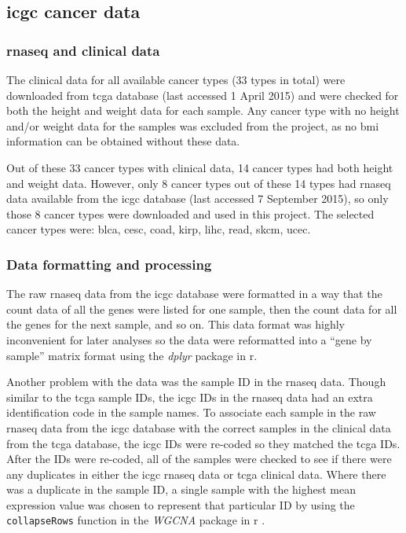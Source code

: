 \subsection{\gls{icgc} cancer data}
\label{sub:icgc_cancer_data}

\subsubsection{\gls{rnaseq} and clinical data}
\label{ssub:rnaseq_and_clinical_data}

The clinical data for all available cancer types (33 types in total) were downloaded from \gls{tcga} database (last accessed 1 April 2015) and were checked for both the height and weight data for each sample.
Any cancer type with no height and/or weight data for the samples was excluded from the project, as no \gls{bmi} information can be obtained without these data.

Out of these 33 cancer types with clinical data, 14 cancer types had both height and weight data.
However, only 8 cancer types out of these 14 types had \gls{rnaseq} data available from the \gls{icgc} database (last accessed 7 September 2015), so only those 8 cancer types were downloaded and used in this project.
The selected cancer types were: \gls{blca}, \gls{cesc}, \gls{coad}, \gls{kirp}, \gls{lihc}, \gls{read}, \gls{skcm}, \gls{ucec}.

\subsubsection{Data formatting and processing}
\label{ssub:data_formatting_and_processing}

The raw \gls{rnaseq} data from the \gls{icgc} database were formatted in a way that the count data of all the genes were listed for one sample, then the count data for all the genes for the next sample, and so on.
This data format was highly inconvenient for later analyses so the data were reformatted into a ``gene by sample'' matrix format using the \textit{dplyr} package in \gls{r}.

Another problem with the data was the sample ID in the \gls{rnaseq} data.
Though similar to the \gls{tcga} sample IDs, the \gls{icgc} IDs in the \gls{rnaseq} data had an extra identification code in the sample names.
To associate each sample in the raw \gls{rnaseq} data from the \gls{icgc} database with the correct samples in the clinical data from the \gls{tcga} database, the \gls{icgc} IDs were re-coded so they matched the \gls{tcga} IDs.
After the IDs were re-coded, all of the samples were checked to see if there were any duplicates in either the \gls{icgc} \gls{rnaseq} data or \gls{tcga} clinical data.
Where there was a duplicate in the sample ID, a single sample with the highest mean expression value was chosen to represent that particular ID by using the \texttt{collapseRows} function in the \textit{WGCNA} package in \gls{r} \citep{Langfelder2008}.


